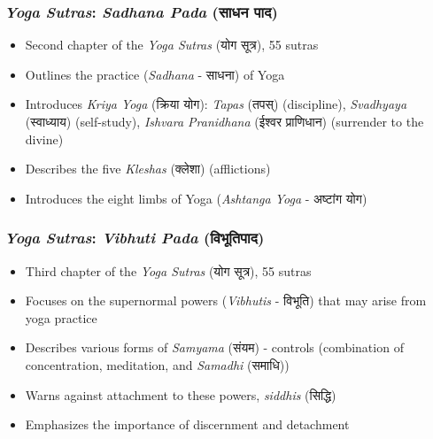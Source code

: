 \begin{frame}[fragile]\frametitle{\textit{Yoga Sutras}: \textit{Sadhana Pada} (साधन पाद)}

    \begin{itemize}
        \item Second chapter of the \textit{Yoga Sutras} (योग सूत्र), 55 sutras
        \item Outlines the practice (\textit{Sadhana} - साधना) of Yoga
        \item Introduces \textit{Kriya Yoga} (क्रिया योग): \textit{Tapas} (तपस्) (discipline), \textit{Svadhyaya} (स्वाध्याय) (self-study), \textit{Ishvara Pranidhana} (ईश्वर प्राणिधान) (surrender to the divine)
        \item Describes the five \textit{Kleshas} (क्लेशा) (afflictions)
        \item Introduces the eight limbs of Yoga (\textit{Ashtanga Yoga} - अष्टांग योग)
    \end{itemize}

\end{frame}

\begin{frame}[fragile]\frametitle{\textit{Yoga Sutras}: \textit{Vibhuti Pada} (विभूतिपाद)}

    \begin{itemize}
        \item Third chapter of the \textit{Yoga Sutras} (योग सूत्र), 55 sutras
        \item Focuses on the supernormal powers (\textit{Vibhutis} - विभूति) that may arise from yoga practice
        \item Describes various forms of \textit{Samyama} (संयम) - controls (combination of concentration, meditation, and \textit{Samadhi} (समाधि))
        \item Warns against attachment to these powers, \textit{siddhis} (सिद्धि)
        \item Emphasizes the importance of discernment and detachment
    \end{itemize}

\end{frame}


